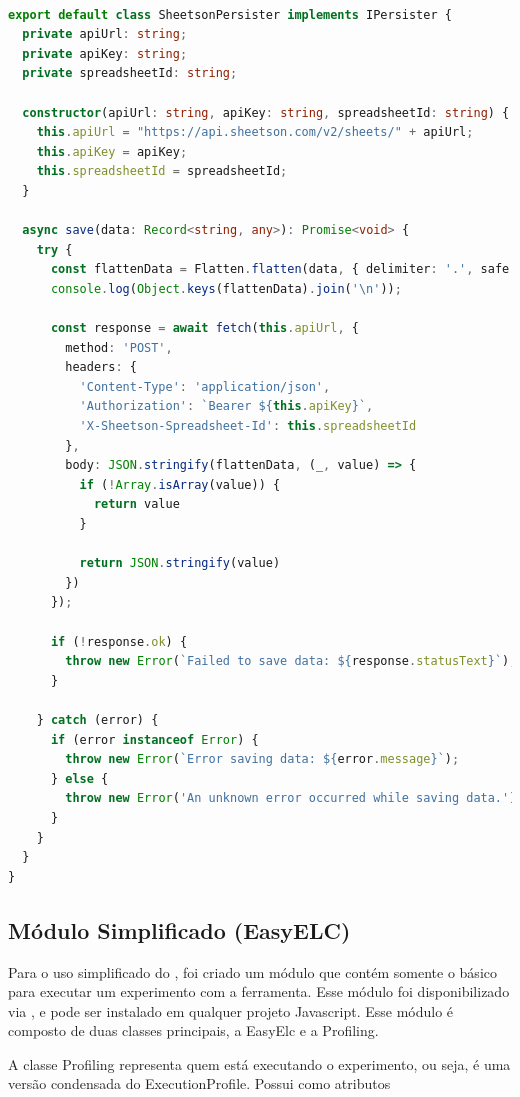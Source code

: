 \documentclass[12pt]{tcc}
\begin{document}
\begin{lstlisting}[label={lst:sheetson_class}, caption={Implementação da classe responsável pela persistência dos dados usando o Sheetson.}, language=TypeScript, breaklines=true]

export default class SheetsonPersister implements IPersister {
  private apiUrl: string;
  private apiKey: string;
  private spreadsheetId: string;

  constructor(apiUrl: string, apiKey: string, spreadsheetId: string) {
    this.apiUrl = "https://api.sheetson.com/v2/sheets/" + apiUrl;
    this.apiKey = apiKey;
    this.spreadsheetId = spreadsheetId;
  }

  async save(data: Record<string, any>): Promise<void> {
    try {
      const flattenData = Flatten.flatten(data, { delimiter: '.', safe: true });
      console.log(Object.keys(flattenData).join('\n'));
      
      const response = await fetch(this.apiUrl, {
        method: 'POST',
        headers: {
          'Content-Type': 'application/json',
          'Authorization': `Bearer ${this.apiKey}`,
          'X-Sheetson-Spreadsheet-Id': this.spreadsheetId
        },
        body: JSON.stringify(flattenData, (_, value) => {
          if (!Array.isArray(value)) {
            return value
          }

          return JSON.stringify(value)
        })
      });

      if (!response.ok) {
        throw new Error(`Failed to save data: ${response.statusText}`);
      }

    } catch (error) {
      if (error instanceof Error) {
        throw new Error(`Error saving data: ${error.message}`);
      } else {
        throw new Error('An unknown error occurred while saving data.');
      }
    }
  }
}
\end{lstlisting}


\subsection{Módulo Simplificado (EasyELC)}

Para o uso simplificado do , foi criado um módulo que contém somente o básico para executar um experimento com a ferramenta. Esse módulo foi disponibilizado via , e pode ser instalado em qualquer projeto Javascript. Esse módulo é composto de duas classes principais, a EasyElc e a Profiling.

A classe Profiling representa quem está executando o experimento, ou seja, é uma versão condensada do ExecutionProfile. Possui como atributos 
\end{document}
